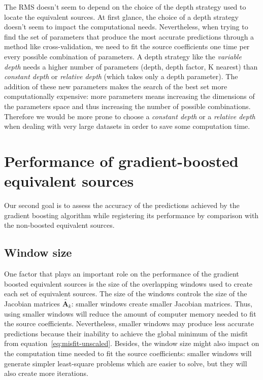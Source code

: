 \documentclass[twocolumn]{article}
\begin{document}
The RMS doesn't seem to depend on the choice of the depth strategy used to
locate the equivalent sources.
At first glance, the choice of a depth strategy doesn't seem to impact the
computational needs.
Nevertheless, when trying to find the set of parameters that produce the most
accurate predictions through a method like cross-validation, we need to fit the
source coefficients one time per every possible combination of parameters.
A depth strategy like the \emph{variable depth} needs a higher number of
parameters (depth, depth factor, K nearest) than \emph{constant depth} or
\emph{relative depth} (which takes only a depth parameter).
The addition of these new parameters makes the search of the best set more
computationally expensive: more parameters means increasing the dimensions of
the parameters space and thus increasing the number of possible combinations.
Therefore we would be more prone to choose a \emph{constant depth} or
a \emph{relative depth} when dealing with very large datasets in order to save
some computation time.


\section{Performance of gradient-boosted equivalent sources}

Our second goal is to assess the accuracy of the predictions achieved by the
gradient boosting algorithm while registering its performance by comparison
with the non-boosted equivalent sources.


\subsection{Window size}
\label{sec:window_size}

One factor that plays an important role on the performance of the gradient
boosted equivalent sources is the size of the overlapping windows used to create
each set of equivalent sources.
The size of the windows controls the size of the Jacobian matrices
$\tilde{\mathbf{A}_k}$: smaller windows create smaller Jacobian matrices.
Thus, using smaller windows will reduce the amount of computer memory needed to
fit the source coefficients.
Nevertheless, smaller windows may produce less accurate predictions because
their inability to achieve the global minimum of the misfit from
equation~\ref{eq:misfit-unscaled}.
Besides, the window size might also impact on the computation time needed to
fit the source coefficients: smaller windows will generate simpler least-square
problems which are easier to solve, but they will also create more iterations.
\end{document}
